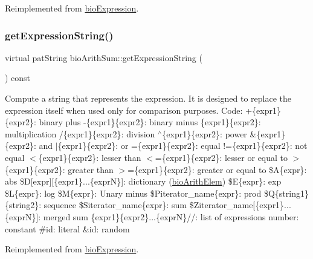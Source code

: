 Reimplemented from \hyperlink{classbio_expression_a3e4b4dca58dbbc6f0e411b30eb3f60b4}{bio\+Expression}.

\mbox{\label{classbio_arith_sum_a1354d70bccf4ba5e3d8ca634005d5489}} 
\subsubsection{\texorpdfstring{get\+Expression\+String()}{getExpressionString()}\hspace{0.1cm}{\footnotesize\ttfamily [2/4]}}
{\footnotesize\ttfamily virtual pat\+String bio\+Arith\+Sum\+::get\+Expression\+String (\begin{DoxyParamCaption}{ }\end{DoxyParamCaption}) const\hspace{0.3cm}{\ttfamily [virtual]}}

Compute a string that represents the expression. It is designed to replace the expression itself when used only for comparison purposes. Code\+: +\{expr1\}\{expr2\}\+: binary plus -\/\{expr1\}\{expr2\}\+: binary minus \{expr1\}\{expr2\}\+: multiplication /\{expr1\}\{expr2\}\+: division $^\wedge$\{expr1\}\{expr2\}\+: power \&\{expr1\}\{expr2\}\+: and $\vert$\{expr1\}\{expr2\}\+: or =\{expr1\}\{expr2\}\+: equal !=\{expr1\}\{expr2\}\+: not equal $<$\{expr1\}\{expr2\}\+: lesser than $<$=\{expr1\}\{expr2\}\+: lesser or equal to $>$\{expr1\}\{expr2\}\+: greater than $>$=\{expr1\}\{expr2\}\+: greater or equal to \$A\{expr\}\+: abs \$D\mbox{[}expr\mbox{]}\mbox{[}\{expr1\}...\{exprN\}\mbox{]}\+: dictionary (\hyperlink{classbio_arith_elem}{bio\+Arith\+Elem}) \$E\{expr\}\+: exp \$L\{expr\}\+: log \$M\{expr\}\+: Unary minus \$\+Piterator\+\_\+name\{expr\}\+: prod \$Q\{string1\}\{string2\}\+: sequence \$\+Siterator\+\_\+name\{expr\}\+: sum \$\+Ziterator\+\_\+name\mbox{[}\{expr1\}...\{exprN\}\mbox{]}\+: merged sum \{expr1\}\{expr2\}...\{exprN\}//\+: list of expressions number\+: constant \#id\+: literal \&id\+: random 

Reimplemented from \hyperlink{classbio_expression_a3e4b4dca58dbbc6f0e411b30eb3f60b4}{bio\+Expression}.

\mbox{\label{classbio_arith_sum_a1354d70bccf4ba5e3d8ca634005d5489}} 
